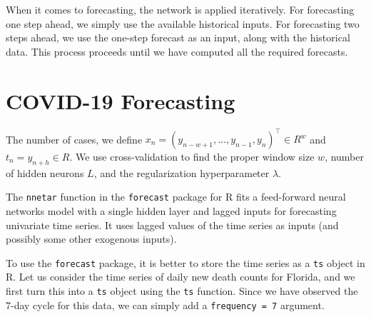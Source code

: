 \documentclass[]{book}
\newenvironment{Shaded}{\begin{snugshade}}{\end{snugshade}}
\newcommand{\KeywordTok}[1]{\textcolor[rgb]{0.13,0.29,0.53}{\textbf{#1}}}
\newcommand{\DataTypeTok}[1]{\textcolor[rgb]{0.13,0.29,0.53}{#1}}
\newcommand{\DecValTok}[1]{\textcolor[rgb]{0.00,0.00,0.81}{#1}}
\newcommand{\StringTok}[1]{\textcolor[rgb]{0.31,0.60,0.02}{#1}}
\newcommand{\OperatorTok}[1]{\textcolor[rgb]{0.81,0.36,0.00}{\textbf{#1}}}
\newcommand{\NormalTok}[1]{#1}
\begin{document}
When it comes to forecasting, the network is applied iteratively. For
forecasting one step ahead, we simply use the available historical
inputs. For forecasting two steps ahead, we use the one-step forecast as
an input, along with the historical data. This process proceeds until we
have computed all the required forecasts.

\section{COVID-19 Forecasting}\label{covid-19-forecasting}

The number of cases, we define
\(x_n = (y_{n-w+1}, ..., y_{n-1}, y_n)^{\top}\in R^{w}\) and
\(t_n = y_{n+h}\in R\). We use cross-validation to find the proper
window size \(w\), number of hidden neurons \(L\), and the
regularization hyperparameter \(\lambda\).

The \texttt{nnetar} function in the \texttt{forecast} package for R fits
a feed-forward neural networks model with a single hidden layer and
lagged inputs for forecasting univariate time series. It uses lagged
values of the time series as inputs (and possibly some other exogenous
inputs).

To use the \texttt{forecast} package, it is better to store the time
series as a \texttt{ts} object in R. Let us consider the time series of
daily new death counts for Florida, and we first turn this into a
\texttt{ts} object using the \texttt{ts} function. Since we have
observed the 7-day cycle for this data, we can simply add a
\texttt{frequency\ =\ 7} argument.

\begin{Shaded}
\end{Shaded}
\end{document}
